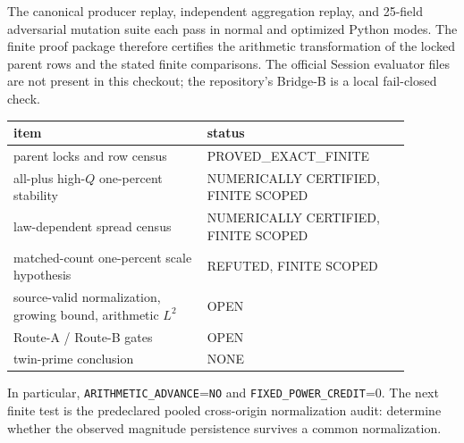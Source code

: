\documentclass[10pt]{article}
\begin{document}
The canonical producer replay, independent aggregation replay, and 25-field
adversarial mutation suite each pass in normal and optimized Python modes.
The finite proof package therefore certifies the arithmetic transformation of
the locked parent rows and the stated finite comparisons.  The official
Session evaluator files are not present in this checkout; the repository's
Bridge-B is a local fail-closed check.

\begin{center}
\small
\begin{tabular}{p{0.43\linewidth}p{0.45\linewidth}}
\toprule
item & status\\
\midrule
parent locks and row census & PROVED\_EXACT\_FINITE\\
all-plus high-\(Q\) one-percent stability & NUMERICALLY CERTIFIED, FINITE SCOPED\\
law-dependent spread census & NUMERICALLY CERTIFIED, FINITE SCOPED\\
matched-count one-percent scale hypothesis & REFUTED, FINITE SCOPED\\
source-valid normalization, growing bound, arithmetic \(L^2\) & OPEN\\
Route-A / Route-B gates & OPEN\\
twin-prime conclusion & NONE\\
\bottomrule
\end{tabular}
\end{center}

In particular, \texttt{ARITHMETIC\_ADVANCE}=\texttt{NO} and
\texttt{FIXED\_POWER\_CREDIT}=0.  The next finite test is the predeclared
pooled cross-origin normalization audit: determine whether the observed
magnitude persistence survives a common normalization.
\end{document}
